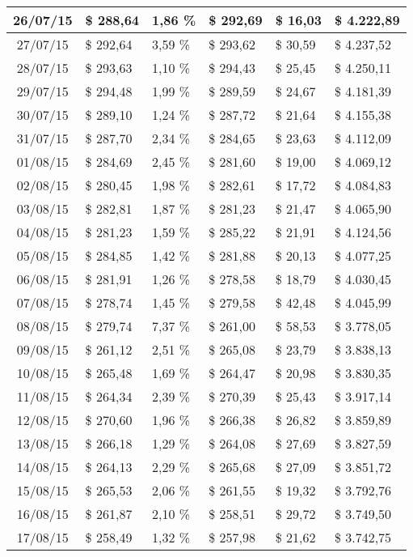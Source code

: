 \begin{small}
\begin{longtable}{|c|l|l|l|l|l|}
26/07/15 & \$ 288,64 & 1,86 \% & \$ 292,69 & \$ 16,03 & \$ 4.222,89 \\ \hline
27/07/15 & \$ 292,64 & 3,59 \% & \$ 293,62 & \$ 30,59 & \$ 4.237,52 \\ \hline
28/07/15 & \$ 293,63 & 1,10 \% & \$ 294,43 & \$ 25,45 & \$ 4.250,11 \\ \hline
29/07/15 & \$ 294,48 & 1,99 \% & \$ 289,59 & \$ 24,67 & \$ 4.181,39 \\ \hline
30/07/15 & \$ 289,10 & 1,24 \% & \$ 287,72 & \$ 21,64 & \$ 4.155,38 \\ \hline
31/07/15 & \$ 287,70 & 2,34 \% & \$ 284,65 & \$ 23,63 & \$ 4.112,09 \\ \hline
01/08/15 & \$ 284,69 & 2,45 \% & \$ 281,60 & \$ 19,00 & \$ 4.069,12 \\ \hline
02/08/15 & \$ 280,45 & 1,98 \% & \$ 282,61 & \$ 17,72 & \$ 4.084,83 \\ \hline
03/08/15 & \$ 282,81 & 1,87 \% & \$ 281,23 & \$ 21,47 & \$ 4.065,90 \\ \hline
04/08/15 & \$ 281,23 & 1,59 \% & \$ 285,22 & \$ 21,91 & \$ 4.124,56 \\ \hline
05/08/15 & \$ 284,85 & 1,42 \% & \$ 281,88 & \$ 20,13 & \$ 4.077,25 \\ \hline
06/08/15 & \$ 281,91 & 1,26 \% & \$ 278,58 & \$ 18,79 & \$ 4.030,45 \\ \hline
07/08/15 & \$ 278,74 & 1,45 \% & \$ 279,58 & \$ 42,48 & \$ 4.045,99 \\ \hline
08/08/15 & \$ 279,74 & 7,37 \% & \$ 261,00 & \$ 58,53 & \$ 3.778,05 \\ \hline
09/08/15 & \$ 261,12 & 2,51 \% & \$ 265,08 & \$ 23,79 & \$ 3.838,13 \\ \hline
10/08/15 & \$ 265,48 & 1,69 \% & \$ 264,47 & \$ 20,98 & \$ 3.830,35 \\ \hline
11/08/15 & \$ 264,34 & 2,39 \% & \$ 270,39 & \$ 25,43 & \$ 3.917,14 \\ \hline
12/08/15 & \$ 270,60 & 1,96 \% & \$ 266,38 & \$ 26,82 & \$ 3.859,89 \\ \hline
13/08/15 & \$ 266,18 & 1,29 \% & \$ 264,08 & \$ 27,69 & \$ 3.827,59 \\ \hline
14/08/15 & \$ 264,13 & 2,29 \% & \$ 265,68 & \$ 27,09 & \$ 3.851,72 \\ \hline
15/08/15 & \$ 265,53 & 2,06 \% & \$ 261,55 & \$ 19,32 & \$ 3.792,76 \\ \hline
16/08/15 & \$ 261,87 & 2,10 \% & \$ 258,51 & \$ 29,72 & \$ 3.749,50 \\ \hline
17/08/15 & \$ 258,49 & 1,32 \% & \$ 257,98 & \$ 21,62 & \$ 3.742,75 \\ \hline

\end{longtable}
\end{small}
